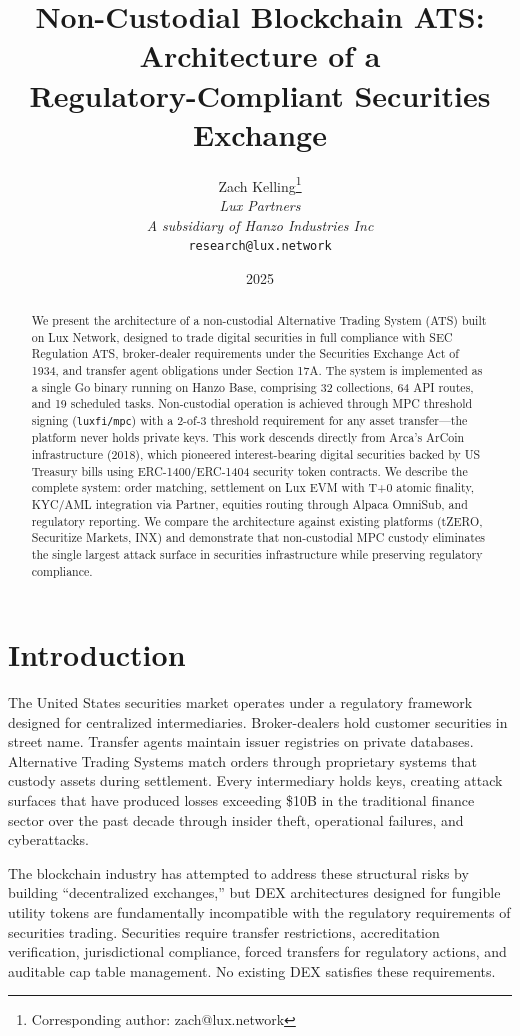 \documentclass[11pt,a4paper]{article}
\title{Non-Custodial Blockchain ATS: Architecture of a\\Regulatory-Compliant Securities Exchange}
\author{
Zach Kelling\thanks{Corresponding author: zach@lux.network}\\
\textit{Lux Partners}\\
\textit{A subsidiary of Hanzo Industries Inc}\\
\texttt{research@lux.network}
}
\date{2025}
\begin{document}
\luxcoverpage

\begin{abstract}
We present the architecture of a non-custodial Alternative Trading System (ATS) built on Lux Network, designed to trade digital securities in full compliance with SEC Regulation ATS, broker-dealer requirements under the Securities Exchange Act of 1934, and transfer agent obligations under Section 17A. The system is implemented as a single Go binary running on Hanzo Base, comprising 32 collections, 64 API routes, and 19 scheduled tasks. Non-custodial operation is achieved through MPC threshold signing (\texttt{luxfi/mpc}) with a 2-of-3 threshold requirement for any asset transfer---the platform never holds private keys. This work descends directly from Arca's ArCoin infrastructure (2018), which pioneered interest-bearing digital securities backed by US Treasury bills using ERC-1400/ERC-1404 security token contracts. We describe the complete system: order matching, settlement on Lux EVM with T+0 atomic finality, KYC/AML integration via Partner, equities routing through Alpaca OmniSub, and regulatory reporting. We compare the architecture against existing platforms (tZERO, Securitize Markets, INX) and demonstrate that non-custodial MPC custody eliminates the single largest attack surface in securities infrastructure while preserving regulatory compliance.
\end{abstract}

\section{Introduction}

The United States securities market operates under a regulatory framework designed for centralized intermediaries. Broker-dealers hold customer securities in street name. Transfer agents maintain issuer registries on private databases. Alternative Trading Systems match orders through proprietary systems that custody assets during settlement. Every intermediary holds keys, creating attack surfaces that have produced losses exceeding \$10B in the traditional finance sector over the past decade through insider theft, operational failures, and cyberattacks.

The blockchain industry has attempted to address these structural risks by building ``decentralized exchanges,'' but DEX architectures designed for fungible utility tokens are fundamentally incompatible with the regulatory requirements of securities trading. Securities require transfer restrictions, accreditation verification, jurisdictional compliance, forced transfers for regulatory actions, and auditable cap table management. No existing DEX satisfies these requirements.
\end{document}
